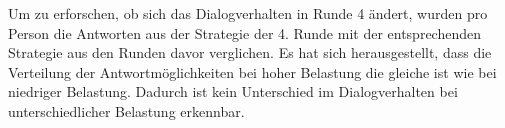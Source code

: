 \documentclass[12pt,a4paper]{scrartcl}
\begin{document}
Um zu erforschen, ob sich das Dialogverhalten in Runde 4 ändert, wurden pro Person die Antworten aus der Strategie der 4. Runde mit der entsprechenden Strategie aus den Runden davor verglichen. Es hat sich herausgestellt, dass die Verteilung der Antwortmöglichkeiten bei hoher Belastung die gleiche ist wie bei niedriger Belastung.
 Dadurch ist kein Unterschied im Dialogverhalten bei unterschiedlicher Belastung erkennbar. 

\end{document}
